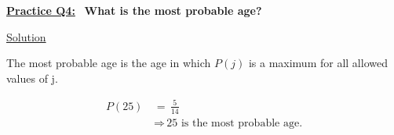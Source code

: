 \underline{\textbf{Practice Q4:}} \ \textbf{What is the most probable age?}

\bigskip

\underline{Solution}

The most probable age is the age in which $P(j)$ is a maximum for all allowed
values of j.

\begin{align*}
    P(25) \, &= \, \frac{5}{14} \\[1.5ex]
    &\Rightarrow \, \boxed{\text{25 is the most probable age.}}
\end{align*}